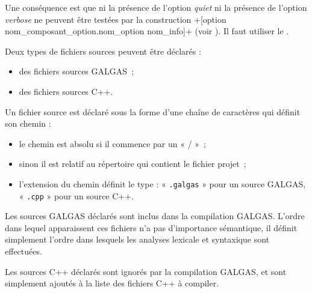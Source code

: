 Une conséquence est que ni la présence de l'option \emph{quiet} ni la présence de l'option \emph{verbose} ne peuvent être testées par la construction \ggsq+[option nom_composant_option.nom_option nom_info]+ (voir ). Il faut utiliser le .








Deux types de fichiers sources peuvent être déclarés :
\begin{itemize}
  \item des fichiers sources GALGAS~;
  \item des fichiers sources C++.
\end{itemize}

Un fichier source est déclaré sous la forme d'une chaîne de caractères qui définit son chemin :
\begin{itemize}
\item le chemin est absolu si il commence par un « / »~;
\item sinon il est relatif au répertoire qui contient le fichier projet~;
\item l'extension du chemin définit le type : « \texttt{.galgas} » pour un source GALGAS, « \texttt{.cpp} » pour un source C++.
\end{itemize}

Les sources GALGAS déclarés sont inclus dans la compilation GALGAS. L'ordre dans lequel apparaissent ces fichiers n'a pas d'importance sémantique, il définit simplement l'ordre dans lesquels les analyses lexicale et syntaxique sont effectuées.

Les sources C++ déclarés sont ignorés par la compilation GALGAS, et sont simplement ajoutés à la liste des fichiers C++ à compiler.



